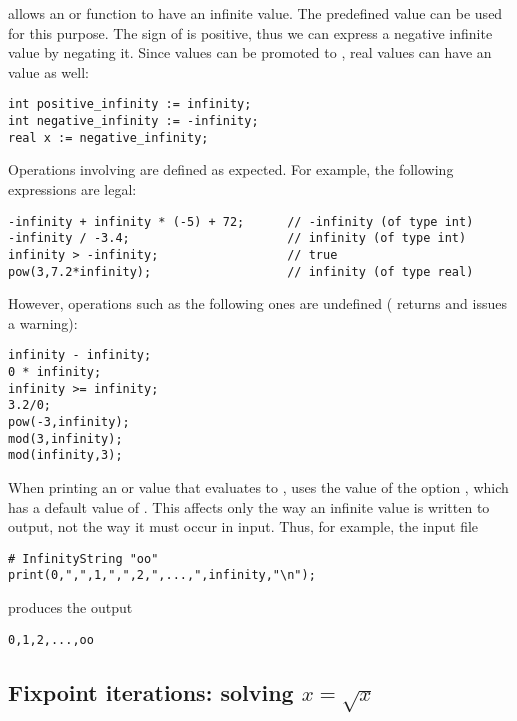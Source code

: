 {\smart} allows an  or  function to have an infinite value.
The predefined  value  can be used for this purpose.
The sign of  is positive, thus we can express a negative
infinite value by negating it.
Since  values can be promoted to , real
values can have an  value as well:
\begin{lstlisting}
int positive_infinity := infinity;
int negative_infinity := -infinity;
real x := negative_infinity;
\end{lstlisting}
Operations involving  are defined as expected.
For example, the following expressions are legal:
\begin{lstlisting}
-infinity + infinity * (-5) + 72;      // -infinity (of type int)
-infinity / -3.4;                      // infinity (of type int)
infinity > -infinity;                  // true
pow(3,7.2*infinity);                   // infinity (of type real)
\end{lstlisting}
However, operations such as the following ones are undefined
({\smart} returns  and issues a warning):
\begin{lstlisting}
infinity - infinity;
0 * infinity;                     
infinity >= infinity;
3.2/0;
pow(-3,infinity);
mod(3,infinity);
mod(infinity,3);
\end{lstlisting}
When printing an  or  value that evaluates to
, {\smart} uses the value of the option ,
which has a default value of .
This affects only the way an infinite value is written to output,
not the way it must occur in input.
Thus, for example, the input file
\begin{lstlisting}
# InfinityString "oo"
print(0,",",1,",",2,",...,",infinity,"\n");
\end{lstlisting}
produces the output
\begin{lstlisting}
0,1,2,...,oo
\end{lstlisting}


\subsection{Fixpoint iterations: solving $x = \sqrt{x}$}


